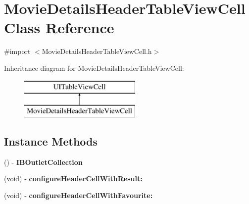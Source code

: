 \section{Movie\+Details\+Header\+Table\+View\+Cell Class Reference}
\label{interface_movie_details_header_table_view_cell}


{\ttfamily \#import $<$Movie\+Details\+Header\+Table\+View\+Cell.\+h$>$}

Inheritance diagram for Movie\+Details\+Header\+Table\+View\+Cell\+:\begin{figure}[H]
\begin{center}
\leavevmode
\includegraphics[height=2.000000cm]{interface_movie_details_header_table_view_cell}
\end{center}
\end{figure}
\subsection*{Instance Methods}
\begin{DoxyCompactItemize}
\item 
() -\/ {\bfseries I\+B\+Outlet\+Collection}\label{interface_movie_details_header_table_view_cell_afc0af54e3881c1dad6a69f0fcebcf2a3}

\item 
(void) -\/ {\bf configure\+Header\+Cell\+With\+Result\+:}
\item 
(void) -\/ {\bf configure\+Header\+Cell\+With\+Favourite\+:}
\end{DoxyCompactItemize}

